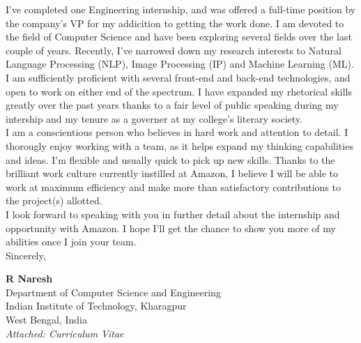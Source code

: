 \documentclass[a4paper,10pt]{extarticle} %
\begin{document}
I’ve completed one Engineering internship, and was offered a full-time position by the company's VP for my addicition to getting the work done. I am devoted to the field of Computer Science and have been exploring several fields over the last couple of years. Recently, I've narrowed down my research interests to Natural Language Processing (NLP), Image Processing (IP) and Machine Learning (ML). I am sufficiently proficient with several front-end and back-end technologies, and open to work on either end of the spectrum. I have expanded my rhetorical skills greatly over the past years thanks to a fair level of public speaking during my intership and my tenure as a governer at my college's literary society. \\

I am a conscientious person who believes in hard work and attention to detail. I thorougly enjoy working with a team, as it helps expand my thinking capabilities and ideas. I'm flexible and usually quick to pick up new skills. Thanks to the brilliant work culture currently instilled at Amazon, I believe I will be able to work at maximum efficiency and make more than satisfactory contributions to the project(s) allotted.\\

I look forward to speaking with you in further detail about the internship and opportunity with Amazon. I hope I’ll get the chance to show you more of my abilities once I join your team.\\

Sincerely,

\textbf{\large{R Naresh}}\\
Department of Computer Science and Engineering\\
Indian Institute of Technology, Kharagpur\\
West Bengal, India\\

\itshape{Attached: Curriculum Vitae}
\end{document}
